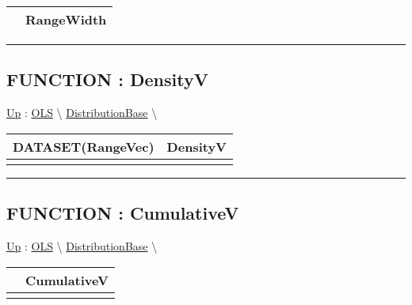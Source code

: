 {\renewcommand{\arraystretch}{1.5}
\begin{tabularx}{\textwidth}{|>{\raggedright\arraybackslash}l|X|}
\hline
\hspace{0pt} & RangeWidth \\
\hline
\end{tabularx}
}

\par


\rule{\linewidth}{0.5pt}
\subsection*{FUNCTION : DensityV}
\hypertarget{ecldoc:linearregression.ols.distributionbase.densityv}{}
\hyperlink{ecldoc:linearregression.ols.distributionbase}{Up} :
\hspace{0pt} \hyperlink{ecldoc:linearregression.ols}{OLS} \textbackslash 
\hspace{0pt} \hyperlink{ecldoc:linearregression.ols.distributionbase}{DistributionBase} \textbackslash 

{\renewcommand{\arraystretch}{1.5}
\begin{tabularx}{\textwidth}{|>{\raggedright\arraybackslash}l|X|}
\hline
\hspace{0pt}DATASET(RangeVec) & DensityV \\
\hline
\multicolumn{2}{|>{\raggedright\arraybackslash}X|}{\hspace{0pt}()} \\
\hline
\end{tabularx}
}

\par


\rule{\linewidth}{0.5pt}
\subsection*{FUNCTION : CumulativeV}
\hypertarget{ecldoc:linearregression.ols.distributionbase.cumulativev}{}
\hyperlink{ecldoc:linearregression.ols.distributionbase}{Up} :
\hspace{0pt} \hyperlink{ecldoc:linearregression.ols}{OLS} \textbackslash 
\hspace{0pt} \hyperlink{ecldoc:linearregression.ols.distributionbase}{DistributionBase} \textbackslash 

{\renewcommand{\arraystretch}{1.5}
\begin{tabularx}{\textwidth}{|>{\raggedright\arraybackslash}l|X|}
\hline
\hspace{0pt} & CumulativeV \\
\hline
\multicolumn{2}{|>{\raggedright\arraybackslash}X|}{\hspace{0pt}()} \\
\hline
\end{tabularx}
}

